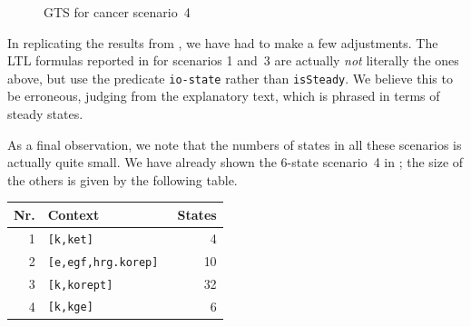 %
\begin{figure}\centering
\scalebox{.9}{}
\caption{GTS for cancer scenario~4}
\label{fig:maude-gts}
\end{figure}
%
In replicating the results from \cite{DBLP:conf/cmsb/BallisBFO24}, we have had to make a few adjustments. The LTL formulas reported in \cite[Page~14]{DBLP:conf/cmsb/BallisBFO24} for scenarios 1 and~3 are actually \emph{not} literally the ones above, but use the predicate \verb=io-state= rather than \verb=isSteady=. We believe this to be erroneous, judging from the explanatory text, which is phrased in terms of steady states.

As a final observation, we note that the numbers of states in all these scenarios is actually quite small. We have already shown the 6-state scenario~4 in ; the size of the others is given by the following table.
%
\begin{center}
\begin{tabular}{rlr}
\bf Nr. & \bf Context & \bf States \\
\hline\hline
1 & \tt [k,ket] & 4 \\
2 & \tt [{e,egf,hrg}.korep] & 10 \\
3 & \tt [k,korept] & 32 \\
4 & \tt [k,kge] & 6
\end{tabular}
\end{center}

